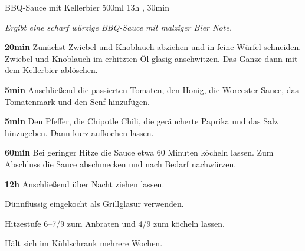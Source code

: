 \documentclass[../recipe-collections/cooking.tex]{subfiles}
\begin{document}
\begin{recipe}{BBQ-Sauce mit Kellerbier} {500ml } {13h , 30min }

  \freeform{}\textit{Ergibt eine scharf würzige BBQ-Sauce mit malziger Bier Note.}


  \textbf{20min}
  Zunächst Zwiebel und Knoblauch abziehen und in feine Würfel schneiden.
  Zwiebel und Knoblauch im erhitzten Öl glasig anschwitzen.
  Das Ganze dann mit dem Kellerbier ablöschen.


  \textbf{5min}
  Anschließend die passierten Tomaten, den Honig, die Worcester Sauce, das Tomatenmark und den Senf hinzufügen.


  \textbf{5min}
  Den Pfeffer, die Chipotle Chili, die geräucherte Paprika und das Salz hinzugeben.
  Dann kurz aufkochen lassen.

  \newstep{}\textbf{60min}
  Bei geringer Hitze die Sauce etwa 60 Minuten köcheln lassen.
  Zum Abschluss die Sauce abschmecken und nach Bedarf nachwürzen.

  \newstep{}\textbf{12h}
  Anschließend über Nacht ziehen lassen.

  \freeform{}\hrulefill{}

  \freeform{}
  Dünnflüssig eingekocht als Grillglasur verwenden.

  \freeform{}
  Hitzestufe 6–7/9 zum Anbraten und 4/9 zum köcheln lassen.

  \freeform{}
  Hält sich im Kühlschrank mehrere Wochen.

\end{recipe}
\end{document}
